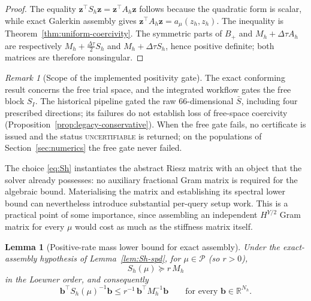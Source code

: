 \documentclass[11pt]{amsart}
\newtheorem{lemma}[theorem]{Lemma}
\theoremstyle{remark}
\newtheorem{remark}[theorem]{Remark}
\newcommand{\R}{\mathbb{R}}
\newcommand{\Pset}{\mathcal{P}}
\newcommand{\Mh}{M_h}
\newcommand{\Ah}{A_h}
\newcommand{\Sh}{S_h}
\newcommand{\dt}{\Delta\tau}
\newcommand{\bb}{\mathbf b}
\newcommand{\zz}{\mathbf z}
\newcommand{\rf}{r}
\begin{document}
\begin{proof}
The equality $\zz^\top\Sh\zz=\zz^\top\Ah\zz$ follows because the quadratic
form is scalar, while exact Galerkin assembly gives
$\zz^\top\Ah\zz=a_\mu(z_h,z_h)$.  The inequality is
Theorem~\ref{thm:uniform-coercivity}.  The symmetric parts of $B_+$ and
$\Mh+\dt\Ah$ are respectively $\Mh+\tfrac{\dt}{2}\Sh$ and
$\Mh+\dt\Sh$, hence positive definite; both matrices are therefore
nonsingular.
\end{proof}

\begin{remark}[Scope of the implemented positivity gate]
\label{rem:spd-gate}
The exact conforming result concerns the free trial space, and the integrated
workflow gates the free block $S_I$. The historical pipeline gated the raw
$66$-dimensional $\bar S$, including four prescribed directions; its failures
do not establish loss of free-space coercivity
(Proposition~\ref{prop:legacy-conservative}). When the free gate fails, no
certificate is issued and the status \textsc{uncertifiable} is returned; on the
populations of Section~\ref{sec:numerics} the free gate never failed.
\end{remark}

The choice \eqref{eq:Sh} instantiates the abstract Riesz matrix with an object
that the solver already possesses: no auxiliary fractional Gram matrix is required for the algebraic bound.
Materialising the matrix and establishing its spectral lower bound can
nevertheless introduce substantial per-query setup work.  This is a practical
point of some importance, since assembling an independent $H^{Y/2}$ Gram
matrix for every $\mu$ would cost as much as the stiffness matrix itself.

\begin{lemma}[Positive-rate mass lower bound for exact assembly]
\label{lem:mass-lower}
Under the exact-assembly hypothesis of Lemma~\ref{lem:Sh-spd}, for
$\mu\in\Pset$ (so $\rf>0$),
\begin{equation}
  \Sh(\mu)\succeq \rf\,\Mh
  \label{eq:S-ge-rM}
\end{equation}
in the Loewner order, and consequently
\begin{equation}
  \bb^\top\Sh(\mu)^{-1}\bb\le \rf^{-1}\,\bb^\top\Mh^{-1}\bb
  \qquad\text{for every }\bb\in\R^{N_h}.
  \label{eq:mass-upper}
\end{equation}
\end{lemma}
\end{document}
